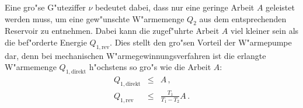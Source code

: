 		Eine gro"se G"uteziffer $\nu$ bedeutet dabei, dass nur eine geringe Arbeit $A$ geleistet werden muss, um eine gew"unschte W"armemenge $Q_2$ aus dem entsprechenden Reservoir zu entnehmen.
		Dabei kann die zugef"uhrte Arbeit $A$ viel kleiner sein als die bef"orderte Energie $Q_{1,\mathrm{rev}}$.
		Dies stellt den gro"sen Vorteil der W"armepumpe dar, denn bei mechanischen W"armegewinnungsverfahren ist die erlangte W"armemenge $Q_{1,\mathrm{direkt}}$ h"ochstens so gro"s wie die Arbeit $A$:
		\begin{eqnarray*}
			Q_{1,\mathrm{direkt}} & \leq & A \,,\\
			Q_{1,\mathrm{rev}} &  \leq & \frac{T_1}{T_1 - T_2} A\,.
		\end{eqnarray*}